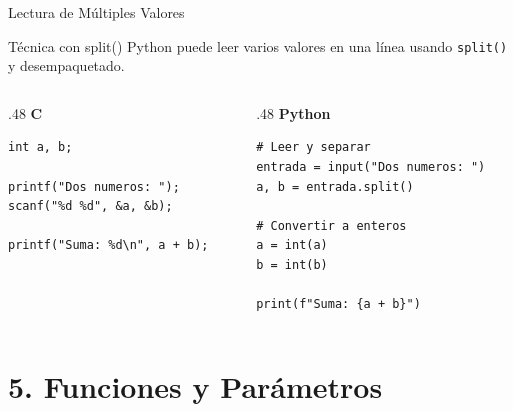 \documentclass{beamer}
\begin{document}
\begin{frame}[fragile]{Lectura de Múltiples Valores}
  \begin{block}{Técnica con split()}
    Python puede leer varios valores en una línea usando \texttt{split()} y desempaquetado.
  \end{block}

  \begin{columns}[T]
    \begin{column}{.48\textwidth}
      \centering\textbf{C}
      \begin{verbatim}
int a, b;

printf("Dos numeros: ");
scanf("%d %d", &a, &b);

printf("Suma: %d\n", a + b);
      \end{verbatim}
    \end{column}
    \begin{column}{.48\textwidth}
      \centering\textbf{Python}
      \begin{verbatim}
# Leer y separar
entrada = input("Dos numeros: ")
a, b = entrada.split()

# Convertir a enteros
a = int(a)
b = int(b)

print(f"Suma: {a + b}")
      \end{verbatim}
    \end{column}
  \end{columns}
\end{frame}

\section{5. Funciones y Parámetros}
\end{document}
